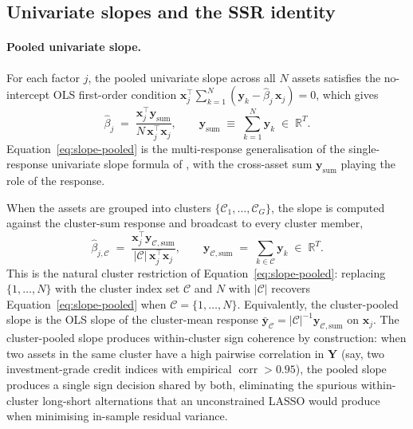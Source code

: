 \documentclass[article]{jss}
\begin{document}
\subsection[Univariate slopes and the SSR identity]{Univariate slopes and the SSR identity} \label{sec:univ-slope}

\paragraph{Pooled univariate slope.}
For each factor $j$, the pooled univariate slope across all $N$ assets
satisfies the no-intercept OLS first-order condition
$\bm{x}_j^\top \sum_{k=1}^{N}\!(\bm{y}_k - \hat{\beta}_j\, \bm{x}_j) = 0$,
which gives
%
\begin{equation} \label{eq:slope-pooled}
\hat{\beta}_j \;=\; \frac{\bm{x}_j^\top \bm{y}_{\mathrm{sum}}}
{N\, \bm{x}_j^\top \bm{x}_j},
\qquad
\bm{y}_{\mathrm{sum}} \;\equiv\; \sum_{k=1}^{N} \bm{y}_k \;\in\; \mathbb{R}^T.
\end{equation}
%
Equation~\ref{eq:slope-pooled} is the multi-response generalisation of
the single-response univariate slope formula of
\cite{Chatterjee+Hastie+Tibshirani:2025}, with the cross-asset sum
$\bm{y}_{\mathrm{sum}}$ playing the role of the response.

When the assets are grouped into clusters
$\{\mathcal{C}_1, \ldots, \mathcal{C}_G\}$, the slope is computed
against the cluster-sum response and broadcast to every cluster member,
%
\begin{equation} \label{eq:slope-cluster}
\hat{\beta}_{j, \mathcal{C}} \;=\;
\frac{\bm{x}_j^\top \bm{y}_{\mathcal{C}, \mathrm{sum}}}
{|\mathcal{C}|\, \bm{x}_j^\top \bm{x}_j},
\qquad
\bm{y}_{\mathcal{C}, \mathrm{sum}} \;=\;
\sum_{k \in \mathcal{C}} \bm{y}_k \;\in\; \mathbb{R}^T.
\end{equation}
%
This is the natural cluster restriction of Equation~\ref{eq:slope-pooled}:
replacing $\{1, \ldots, N\}$ with the cluster index set $\mathcal{C}$ and
$N$ with $|\mathcal{C}|$ recovers Equation~\ref{eq:slope-pooled} when
$\mathcal{C} = \{1, \ldots, N\}$. Equivalently, the cluster-pooled slope is
the OLS slope of the cluster-mean response
$\bar{\bm{y}}_{\mathcal{C}} = |\mathcal{C}|^{-1} \bm{y}_{\mathcal{C},\mathrm{sum}}$
on $\bm{x}_j$.
%
The cluster-pooled slope produces within-cluster sign coherence by
construction: when two assets in the same cluster have a high pairwise
correlation in $\bm{Y}$ (say, two investment-grade credit indices with
empirical $\operatorname{corr} > 0.95$), the pooled slope produces a
single sign decision shared by both, eliminating the spurious
within-cluster long-short alternations that an unconstrained LASSO
would produce when minimising in-sample residual variance.
\end{document}
